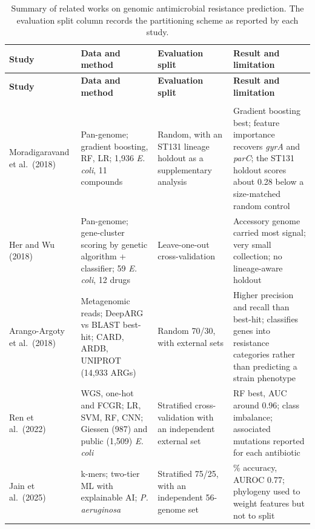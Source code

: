 {\footnotesize
\setlength{\tabcolsep}{5pt}
\renewcommand{\arraystretch}{1.25}
\begin{longtable}{|>{\raggedright\arraybackslash}p{2.7cm}|>{\raggedright\arraybackslash}p{3.9cm}|>{\raggedright\arraybackslash}p{2.2cm}|>{\raggedright\arraybackslash}p{4.7cm}|}
\caption{Summary of related works on genomic antimicrobial resistance prediction. The evaluation split column records the partitioning scheme as reported by each study.}
\label{tab:summary}\\
\hline
\textbf{Study} & \textbf{Data and method} & \textbf{Evaluation split} & \textbf{Result and limitation} \\
\hline
\endfirsthead
\hline
\textbf{Study} & \textbf{Data and method} & \textbf{Evaluation split} & \textbf{Result and limitation} \\
\hline
\endhead
\hline
\multicolumn{4}{r}{\footnotesize\textit{Continued on the next page}}\\
\endfoot
\hline
\endlastfoot
Moradi\-garavand et al.\ (2018) \cite{moradigaravand2018} & Pan-genome; gradient boosting, RF, LR; 1,936 \textit{E. coli}, 11 compounds & Random, with an ST131 lineage holdout as a supplementary analysis & Gradient boosting best; feature importance recovers \textit{gyrA} and \textit{parC}; the ST131 holdout scores about 0.28 below a size-matched random control \\ \hline
Her and Wu (2018) \cite{her2018pangenome} & Pan-genome; gene-cluster scoring by genetic algorithm + classifier; 59 \textit{E. coli}, 12 drugs & Leave-one-out cross-validation & Accessory genome carried most signal; very small collection; no lineage-aware holdout \\ \hline
Arango-Argoty et al.\ (2018) \cite{ArangoArgoty2018} & Metagenomic reads; DeepARG vs BLAST best-hit; CARD, ARDB, UNIPROT (14,933 ARGs) & Random 70/30, with external sets & Higher precision and recall than best-hit; classifies genes into resistance categories rather than predicting a strain phenotype \\ \hline
Ren et al.\ (2022) \cite{Ren2022} & WGS, one-hot and FCGR; LR, SVM, RF, CNN; Giessen (987) and public (1,509) \textit{E. coli} & Stratified cross-validation with an independent external set & RF best, AUC around 0.96; class imbalance; associated mutations reported for each antibiotic \\ \hline
Jain et al.\ (2025) \cite{jain2025paeruginosa} & k-mers; two-tier ML with explainable AI; \textit{P. aeruginosa} & Stratified 75/25, with an independent 56-genome set & 79\% accuracy, AUROC 0.77; phylogeny used to weight features but not to split \\ \hline

\end{longtable}}
